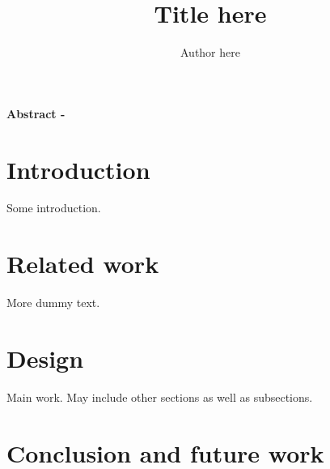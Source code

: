 \documentclass[a4paper,latin]{paper}
\title{Title here}
\author{Author here}
\begin{document}
 
\twocolumn[
\maketitle
]

\textbf{
Abstract - \lipsum[1]
}

\section{Introduction} 

Some introduction. \lipsum[2]

\section{Related work} 

More dummy text. \lipsum[4] 

\section{Design} 

Main work. May include other sections as well as subsections. \lipsum[5]

\section{Conclusion and future work} 

\lipsum[6] 
\end{document}
